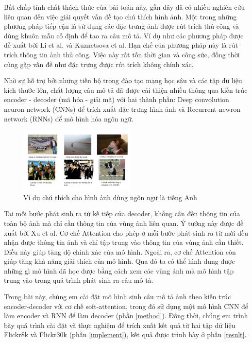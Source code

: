 \documentclass[conference]{IEEEtran}
\begin{document}
Bất chấp tính chất thách thức của bài toán này, gần đây đã có nhiều nghiên cứu liên quan đến việc giải quyết vấn đề tạo chú thích hình ảnh.
Một trong những phương pháp tiếp cận là sử dụng các đặc trưng ảnh được rút trích thủ công và dùng khuôn mẫu cố định để tạo ra câu mô tả. Ví dụ như các phương pháp được đề xuất bới Li et al.\cite{li2011composing} và Kuznetsova et al.\cite{kuznetsova2014treetalk}
Hạn chế của phương pháp này là  rút trích thông tin ảnh thủ công. Việc này rất tốn thời gian và công sức, đồng thời cũng gặp vấn đề như đặc trưng được rút trích không chính xác.

Nhờ sự hỗ trợ bởi những tiến bộ trong đào tạo mạng học sâu\cite{krizhevsky2017imagenet} và các tập dữ liệu kích thước lớn\cite{russakovsky2015imagenet}, chất lượng câu mô tả đã được cải thiện nhiều thông qua kiến trúc encoder - decoder (mã hóa - giải mã) với hai thành phần: Deep convolution neuron network (CNNs) để trích xuất đặc trưng hình ảnh và Recurrent newron network (RNNs) để mô hình hóa ngôn ngữ.

\begin{figure}[t]
\includegraphics[width=0.52\textwidth]{assets/examples.jpg}
  \caption{Ví dụ chú thích cho hình ảnh dùng ngôn ngữ là tiếng Anh}
  \label{fig:example}
\end{figure}

Tại mỗi bước phát sinh ra từ kế tiếp của decoder, không cần đến thông tin của toàn bộ ảnh mà chỉ cần thông tin của vùng ảnh liên quan. Ý tưởng này được đề xuất bởi Xu et al.\cite{xu2015show}
 Cơ chế Attention cho phép ở mỗi bước phát sinh ra từ mới đều nhận được thông tin ảnh và chỉ tập trung vào thông tin của vùng ảnh cần thiết. Điều này giúp tăng độ chính xác của mô hình.
 Ngoài ra, cơ chế Attention còn giúp tăng khả năng giải thích của mô hình.
 Qua đó ta có thể hình dung được những gì mô hình đã học được bằng cách xem các vùng ảnh mà mô hình tập trung vào trong quá trình phát sinh ra câu mô tả.

Trong bài này, chúng em cài đặt mô hình sinh câu mô tả ảnh theo kiến trúc encoder-decoder với cơ chế soft-attention, trong đó sử dụng một mô hình CNN để làm encoder và RNN để làm decoder (phần \ref{method}).
Đồng thời, chúng em trình bày quá trình cài đặt và thực nghiệm để trích xuất kết quả từ hai tập dữ liệu Flickr8k\cite{hodosh2013framing} và Flickr30k\cite{young2014image} (phần \ref{implement}), kết quả được trình bày ở phần \ref{result}.
\end{document}
